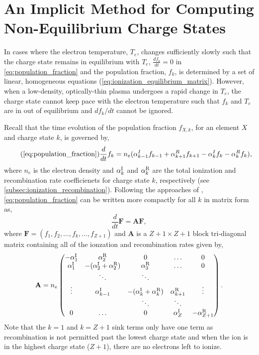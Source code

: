 \chapter{An Implicit Method for Computing Non-Equilibrium Charge States}\label{ap:nonequilibrium_implicit}
\thispagestyle{firstpageofchapterstyle}

 In cases where the electron temperature, $T_e$, changes sufficiently slowly such that the charge state remains in equilibrium with $T_e$, $\frac{df_k}{dt}=0$ in \autoref{eq:population_fraction} and the population fraction, $f_k$, is determined by a set of linear, homogeneous equations (\autoref{eq:ionization_equilibrium_matrix}). However, when a low-density, optically-thin plasma undergoes a rapid change in $T_e$, the charge state cannot keep pace with the electron temperature such that $f_k$ and $T_e$ are in out of equilibrium and $df_k/dt$ cannot be ignored. 
 
 Recall that the time evolution of the population fraction $f_{X,k}$, for an element $X$ and charge state $k$, is governed by,
 \begin{equation*}\tag{\ref{eq:population_fraction}}
     \frac{d}{dt}f_k = n_e(\alpha_{k-1}^I f_{k-1} + \alpha_{k+1}^R f_{k+1} - \alpha_{k}^I f_k - \alpha_k^R f_k),
 \end{equation*}
 where $n_e$ is the electron density and $\alpha^\textup{I}_k$ and $\alpha^\textup{R}_k$ are the total ionization and recombination rate coefficienets for charge state $k$, respectively (see \autoref{subsec:ionization_recombination}). Following the approaches of \citet{masai_x-ray_1984,hughes_self-consistent_1985}, \autoref{eq:population_fraction} can be written more compactly for all $k$ in matrix form as,
 \begin{equation}\label{eq:population_fraction_matrix}
     \frac{d}{dt}\mathbf{F} = \mathbf{A}\mathbf{F},
 \end{equation}
 where $\mathbf{F}=(f_1,f_2,\ldots,f_k,\ldots,f_{Z+1})$ and $\mathbf{A}$ is a $Z+1{\times}Z+1$ block tri-diagonal matrix containing all of the ionzation and recombination rates given by,
 \begin{equation}\label{eq:rate_matrix}
    \mathbf{A} = n_e
        \begin{pmatrix}
            -\alpha^\textup{I}_1 & \alpha^\textup{R}_2 & 0 & \dots & 0 \\
            \alpha^\textup{I}_1 & -(\alpha^\textup{I}_2 + \alpha^\textup{R}_2) & \alpha^\textup{R}_3 & \dots & 0 \\
             & \ddots & \ddots & &  \\
            \vdots & \alpha^\textup{I}_{k-1} & -(\alpha^\textup{I}_k + \alpha^\textup{R}_k) & \alpha^\textup{R}_{k+1} & \vdots \\
             & & \ddots & \ddots & \\
            0 & \dots & 0 & \alpha^\textup{I}_{Z} & -\alpha^\textup{R}_{Z+1} 
        \end{pmatrix}.
\end{equation}
Note that the $k=1$ and $k=Z+1$ sink terms only have one term as recombination is not permitted past the lowest charge state and when the ion is in the highest charge state ($Z+1$), there are no electrons left to ionize.

